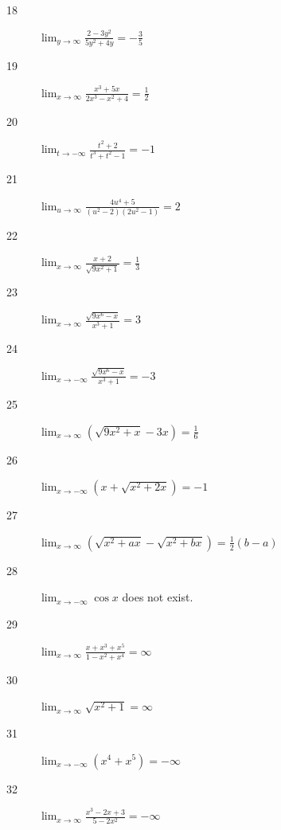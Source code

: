 \documentclass[letterpaper]{exam}
\begin{document}
\begin{description}
      \item[18] 
        $\lim_{y \to \infty} \frac{2 - 3y^2}{5y^2 + 4y} = \boxed{ - \frac{3}{5} }$

      \item[19] 
        $\lim_{x \to \infty} \frac{x^3 + 5x}{2x^3 - x^2 + 4} = \boxed{ \frac{1}{2} }$

      \item[20] 
        $\lim_{t \to -\infty} \frac{t^2 + 2}{t^3 + t^2 - 1} = \boxed{ -1 }$

      \item[21] 
        $\lim_{u \to \infty} \frac{4u^4 + 5}{\left(u^2 - 2 \right) \left(2u^2 - 1 \right)} 
          = \boxed{ 2 }$

      \item[22] 
        $\lim_{x \to \infty} \frac{x + 2}{\sqrt{9x^2 + 1}} = \boxed{ \frac{1}{3} }$

      \item[23] 
        $\lim_{x \to \infty} \frac{\sqrt{9x^6 - x}}{x^3 + 1} = \boxed{ 3 }$

      \item[24] 
        $\lim_{x \to -\infty} \frac{\sqrt{9x^6 - x}}{x^3 + 1} = \boxed{ -3 }$

      \item[25] 
        $\lim_{x \to \infty} \left( \sqrt{9x^2 + x} - 3x \right) 
          = \boxed{ \frac{1}{6} }$

      \item[26] 
        $\lim_{x \to -\infty} \left( x + \sqrt{x^2 + 2x} \right) = \boxed{ -1 }$

      \item[27] 
        $\lim_{x \to \infty} \left( \sqrt{x^2 + ax} - \sqrt{x^2 + bx} \right) 
          = \boxed{ \frac{1}{2} (b - a) }$

      \item[28] 
        $\lim_{x \to -\infty} \cos x$ does not exist.

      \item[29] 
        $\lim_{x \to \infty} \frac{x + x^3 + x^5}{1 - x^2 + x^4} = \boxed{ \infty }$

      \item[30] 
        $\lim_{x \to \infty} \sqrt{x^2 + 1} = \boxed{ \infty }$

      \item[31] 
        $\lim_{x \to -\infty} \left( x^4 + x^5 \right) = \boxed{ -\infty }$

      \item[32] 
        $\lim_{x \to \infty} \frac{x^3 - 2x + 3}{5 - 2x^2} = \boxed{ -\infty }$


\end{description}
\end{document}
